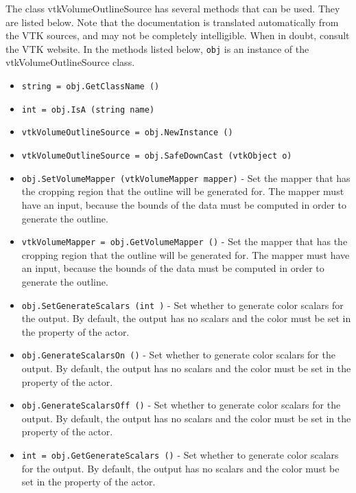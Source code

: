 The class vtkVolumeOutlineSource has several methods that can be used.
  They are listed below.
Note that the documentation is translated automatically from the VTK sources,
and may not be completely intelligible.  When in doubt, consult the VTK website.
In the methods listed below, \verb|obj| is an instance of the vtkVolumeOutlineSource class.
\begin{itemize}
\item  \verb|string = obj.GetClassName ()|

\item  \verb|int = obj.IsA (string name)|

\item  \verb|vtkVolumeOutlineSource = obj.NewInstance ()|

\item  \verb|vtkVolumeOutlineSource = obj.SafeDownCast (vtkObject o)|

\item  \verb|obj.SetVolumeMapper (vtkVolumeMapper mapper)| -  Set the mapper that has the cropping region that the outline will
 be generated for.  The mapper must have an input, because the
 bounds of the data must be computed in order to generate the
 outline.

\item  \verb|vtkVolumeMapper = obj.GetVolumeMapper ()| -  Set the mapper that has the cropping region that the outline will
 be generated for.  The mapper must have an input, because the
 bounds of the data must be computed in order to generate the
 outline.

\item  \verb|obj.SetGenerateScalars (int )| -  Set whether to generate color scalars for the output.  By default,
 the output has no scalars and the color must be set in the
 property of the actor.

\item  \verb|obj.GenerateScalarsOn ()| -  Set whether to generate color scalars for the output.  By default,
 the output has no scalars and the color must be set in the
 property of the actor.

\item  \verb|obj.GenerateScalarsOff ()| -  Set whether to generate color scalars for the output.  By default,
 the output has no scalars and the color must be set in the
 property of the actor.

\item  \verb|int = obj.GetGenerateScalars ()| -  Set whether to generate color scalars for the output.  By default,
 the output has no scalars and the color must be set in the
 property of the actor.


\end{itemize}
